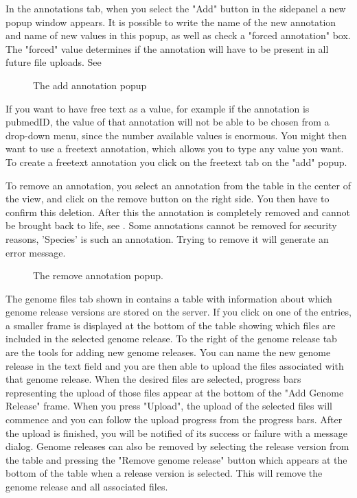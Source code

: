 In the annotations tab, when you select the "Add" button in the sidepanel a new popup window appears. It is possible to write the name of the new annotation and name of new values in this popup, as well as check a "forced annotation" box. The "forced" value determines if the annotation will have to be present in all future file uploads. See 

\begin{figure}[htb]
	\caption{The add annotation popup}
	\label{fig:adm_addAnnotationPopup}
\end{figure}

If you want to have free text as a value, for example if the annotation is pubmedID, the value of that annotation will not be able to be chosen from a drop-down menu, since the number available values is enormous. You might then want to use a freetext annotation, which allows you to type any value you want. To create a freetext annotation you click on the freetext tab on the "add" popup. 


To remove an annotation, you select an annotation from the table in the center of the view, and click on the remove button on the right side. You then have to confirm this deletion. After this the annotation is completely removed and cannot be brought back to life, see . Some annotations cannot be removed for security reasons, 'Species' is such an annotation. Trying to remove it will generate an error message.
\begin{figure}[h!]
\caption{The remove annotation popup.}
\label{fig:adm_desktopRemoveAnnotation}
\end{figure}

The genome files tab shown in  contains a table with information about which genome release versions are stored on the server. If you click on one of the entries, a smaller frame is displayed at the bottom of the table showing which files are included in the selected genome release. To the right of the genome release tab are the tools for adding new genome releases. You can name the new genome release in the text field and you are then able to upload the files associated with that genome release. When the desired files are selected, progress bars representing the upload of those files appear at the bottom of the "Add Genome Release" frame. When you press "Upload", the upload of the selected files will commence and you can follow the upload progress from the progress bars. After the upload is finished, you will be notified of its success or failure with a message dialog.
Genome releases can also be removed by selecting the release version from the table and pressing the "Remove genome release" button which appears at the bottom of the table when a release version is selected. This will remove the genome release and all associated files.

